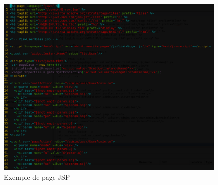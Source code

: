 {  \begin{figure}[hb]
    \begin{center}
      \includegraphics[scale=0.25]{img/jsp-sample.png}
      \caption{Exemple de page JSP}
      \label{servlet-demo}
    \end{center}
  \end{figure}
}


